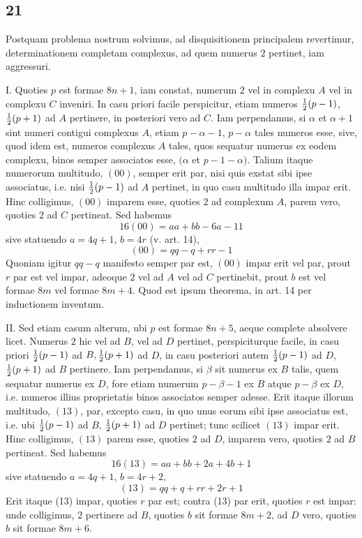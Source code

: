 \documentclass[twoside,12pt, showframe]{memoir}
\let\oldfrac\frac
\def\frac#1#2{\mathchoice{\tfrac{#1}{#2}}{\oldfrac{#1}{#2}}{\genfrac{}{}{}{2}{#1}{#2\mathstrut}}{\genfrac{}{}{}{3}{#1}{#2\mathstrut}}}
\begin{document}
\subsection*{21}
 
Postquam problema nostrum solvimus, ad disquisitionem principalem revertimur, determinationem completam complexus, ad quem numerus \(2\) pertinet, iam aggressuri.
 
I. Quoties \(p\) est formae \(8 n+1\), iam constat, numerum \(2\) vel in complexu \(A\) vel in complexu \(C\) inveniri. In casu priori facile perspicitur, etiam numeros \(\frac{1}{2}(p-1)\), \(\frac{1}{2}(p+1)\) ad \(A\) pertinere, in posteriori vero ad \(C\). Iam perpendamus, si \(\alpha\) et \(\alpha+1\) sint numeri contigui complexus \(A\), etiam \(p-\alpha-1\), \(p-\alpha\) tales numeros esse, sive, quod idem est, numeros complexus \(A\) tales, quos sequatur numerus ex eodem complexu, binos semper associatos esse, \((\alpha\) et \(p-1-\alpha)\). Talium itaque numerorum multitudo, \((00)\), semper erit par, nisi quis exstat sibi ipse associatus, i.e. nisi \(\frac{1}{2}(p-1)\) ad \(A\) pertinet, in quo casu multitudo illa impar erit. Hinc colligimus, \((00)\) imparem esse, quoties \(2\) ad complexum \(A\), parem vero, quoties \(2\) ad \(C\) pertineat. Sed habemus
\[16(00)=a a+b b-6 a-11\]
sive statuendo \(a=4 q+1\), \(b=4 r\) (v. art. 14),
\[(00)=q q-q+r r-1\]
Quoniam igitur \(q q-q\) manifesto semper par est, \((00)\) impar erit vel par, prout \(r\) par est vel impar, adeoque \(2\) vel ad \(A\) vel ad \(C\) pertinebit, prout \(b\) est vel formae \(8 m\) vel formae \(8 m+4\). Quod est ipsum theorema, in art. 14 per inductionem inventum.
 
II. Sed etiam casum alterum, ubi \(p\) est formae \(8 n+5\), aeque complete absolvere licet. Numerus \(2\) hic vel ad \(B\), vel ad \(D\) pertinet, perspiciturque facile, in casu priori \(\frac{1}{2}(p-1)\) ad \(B, \frac{1}{2}(p+1)\) ad \(D\), in casu posteriori autem \(\frac{1}{2}(p-1)\) ad \(D\), \(\frac{1}{2}(p+1)\) ad \(B\) pertinere. Iam perpendamus, si \(\beta\) sit numerus ex \(B\) talis, quem sequatur numerus ex \(D\), fore etiam numerum \(p-\beta-1\) ex \(B\) atque \(p-\beta\) ex \(D\), i.e. numeros illius proprietatis binos associatos semper adesse. Erit itaque illorum multitudo, \((13)\), par, excepto casu, in quo unus eorum sibi ipse associatus est, i.e. ubi \(\frac{1}{2}(p-1)\) ad \(B\), \(\frac{1}{2}(p+1)\) ad \(D\) pertinet; tunc scilicet \((13)\) impar erit. Hinc colligimus, \((13)\) parem esse, quoties \(2\) ad \(D\), imparem vero, quoties \(2\) ad \(B\) pertineat. Sed habemus
\[16(13)=a a+b b+2 a+4 b+1\]\clearpage\noindent%
sive statuendo \(a=4 q+1\), \(b=4 r+2\),
\[(13)=q q+q+r r+2 r+1\]
Erit itaque (13) impar, quoties \(r\) par est; contra (13) par erit, quoties \(r\) est impar: unde colligimus, \(2\) pertinere ad \(B\), quoties \(b\) sit formae \(8 m+2\), ad \(D\) vero, quoties \(b\) sit formae \(8 m+6\).\\
\end{document}
